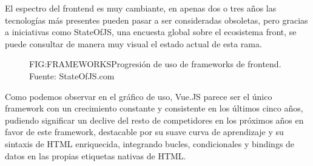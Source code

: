 
El espectro del frontend es muy cambiante, en apenas dos o tres años las tecnologías más presentes pueden pasar a ser consideradas obsoletas, pero gracias a iniciativas como StateOfJS, una encuesta global sobre el ecosistema front, se puede consultar de manera muy visual el estado actual de esta rama.

\begin{figure}[Frontend frameworks]{FIG:FRAMEWORKS}{Progresión de uso de frameworks de frontend. Fuente: StateOfJS.com}
\end{figure}

Como podemos observar en el gráfico de uso, Vue.JS parece ser el único framework con un crecimiento constante y consistente en los últimos cinco años, pudiendo significar un declive del resto de competidores en los próximos años en favor de este framework, destacable por su suave curva de aprendizaje y su sintaxis de HTML enriquecida, integrando bucles, condicionales y bindings de datos en las propias etiquetas nativas de HTML.
